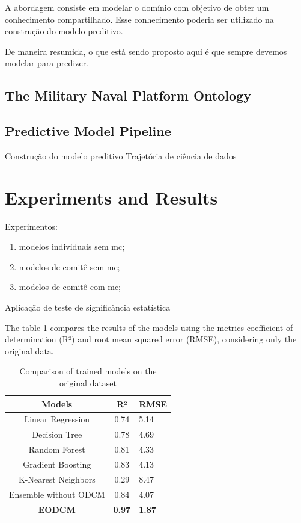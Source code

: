 \documentclass[
]{ceurart}
\begin{document}
\par A abordagem consiste em modelar o domínio com objetivo de obter um conhecimento compartilhado. Esse conhecimento poderia ser utilizado na construção do modelo preditivo.

\par De maneira resumida, o que está sendo proposto aqui é que sempre devemos modelar para predizer.

\subsection{The Military Naval Platform Ontology}

\subsection{Predictive Model Pipeline}
Construção do modelo preditivo
Trajetória de ciência de dados

\section{Experiments and Results}

Experimentos:
\begin{enumerate}
\item modelos individuais sem mc;
\item modelos de comitê sem mc;
\item modelos de comitê com mc;
\end{enumerate}

Aplicação de teste de significância estatística 

The table \ref{tab:comparison-original} compares the results of the models using the metrics coefficient of determination (R²) and root mean squared error (RMSE), considering only the original data.

\begin{table}[ht]
  \caption{Comparison of trained models on the original dataset}
  \label{tab:comparison-original}
  \begin{tabular}{ccl}
    \toprule
    Models & R² & RMSE \\
    \midrule
    Linear Regression & 0.74 & 5.14\\
    Decision Tree & 0.78 & 4.69\\
    Random Forest & 0.81 & 4.33\\
    Gradient Boosting & 0.83 & 4.13\\
    K-Nearest Neighbors & 0.29 & 8.47\\
    Ensemble without ODCM & 0.84 & 4.07\\
    \textbf{EODCM} & \textbf{0.97} & \textbf{1.87}\\
  \bottomrule
\end{tabular}
\end{table}
\end{document}
